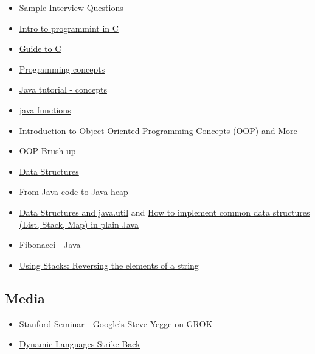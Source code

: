 \documentclass[letterpaper]{article}
\begin{document}
\begin{itemize}
\item \href{http://kundansingh.com/interview/#h1}{Sample Interview Questions}
\item \href{http://www.cprogramming.com/tutorial/c/lesson1.html}{Intro to programmint in C}
\item \href{http://www.acm.uiuc.edu/webmonkeys/book/c_guide/1.2.html}{Guide to C}
\item \href{http://www.ncl.ucar.edu/Document/HLUs/User_Guide/classes/classoview.shtml}{Programming concepts}
\item \href{http://docs.oracle.com/javase/tutorial/java/concepts/}{Java tutorial - concepts}
\item \href{http://introcs.cs.princeton.edu/java/21function/}{java functions}
\item \href{http://www.codeproject.com/Articles/22769/Introduction-to-Object-Oriented-Programming-Concep}{Introduction to Object Oriented Programming Concepts (OOP) and More}
\item \href{http://www.victusspiritus.com/2011/03/15/brushing-up-on-computer-science-part-2-object-oriented-programming-oop/}{OOP Brush-up} 
\item \href{http://www.seas.gwu.edu/~drum/cs1112/lectures/module8/module8.html}{Data Structures}
\item \href{http://www.ibm.com/developerworks/library/j-codetoheap/}{From Java code to Java heap}
\item \href{http://www.cafeaulait.org/books/jdr/examples/21/}{Data Structures and java.util} 
and \href{http://www.vogella.com/articles/JavaDatastructures/article.html}{How to implement common data structures (List, Stack, Map) in plain Java}
\item \href{http://introcs.cs.princeton.edu/java/92symbolic/Fibonacci.java.html}{Fibonacci - Java}
\item \href{http://www.tutorialspoint.com/javaexamples/data_reverse.htm}{Using Stacks: Reversing the elements of a string} 
\end{itemize} 
 
\subsection{Media}
 \begin{itemize}
 \item \href{http://www.youtube.com/watch?v=KTJs-0EInW8}{Stanford Seminar - Google's Steve Yegge on GROK}
 \item \href{http://www.youtube.com/watch?v=tz-Bb-D6teE}{Dynamic Languages Strike Back} 
 \end{itemize}
\end{document}

